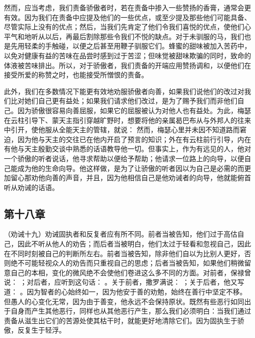 然而，应当考虑，我们责备骄傲者时，若在责备中掺入一些赞扬的香膏，通常会更有效。因为我们在责备中应提及他们的一些优点，或至少提及那些他们可能具备、尽管实际上没有的优点；然后，当我们先肯定了他们令我们喜悦的优点，使他们心平气和地听从以后，再最后割除那些令我们不悦的缺点。对于未驯服的马，我们也是先用轻柔的手触碰，以便之后甚至用鞭子驯服它们。蜂蜜的甜味被加入苦药中，以免对健康有益的苦味在品尝时感到过于苦涩；但味觉被甜味欺骗的同时，致命的体液被苦味排出。所以，对于骄傲者，我们责备的开端应用赞扬调和，以便他们在接受所爱的称赞之时，也能接受所憎恨的责备。\par

此外，我们在多数情况下能更有效地劝服骄傲者向善，如果我们说他们的改过对我们比对她们自己更有益处；如果我们请求他们改过，是为了赐予我们而非他们自己。因为骄傲很容易向善屈服，如果它的屈服被认为对他人也有益处。为此，梅瑟在云柱引导下、蒙天主指引穿越旷野时，想要将他的亲属曷巴布从与外邦人的往来中引开，使他服从全能天主的管辖，就说：  然而，梅瑟心里并未因不知道路而窘迫，因为他与天主的交往已在他内开启了预言的知识；外在有云柱前行引导，内在有他与天主殷勤交谈中熟悉的话语教导他一切。但事实上，作为有远见的人，他对一个骄傲的听者说话，他寻求帮助以便给予帮助；他请求一位路上的向导，以便自己能成为他的生命向导。他这样做，是为了让骄傲的听者因以为自己是必需的而更加留心那劝他向善的声音，并且，因为他相信自己是他劝诫者的向导，他就能俯首听从劝诫的话语。\par


\subsection{第十八章}

\par

（劝诫十九）劝诫固执者和反复者应有所不同。前者当被告知，他们过于高估自己，因此不听从他人的劝告；而后者当被明白，他们太过于轻看和忽视自己，因此在不同时刻被自己的判断所左右。前者当被告知，除非他们自以为比别人更好，否则绝不可能轻视众人的劝告而只重视自己的思虑；后者当被告知，如果他们稍微留意自己的本相，变化的微风绝不会使他们卷进这么多不同的方面。对前者，保禄曾说： ；对后者，应听到这句话： 。关于前者，撒罗满说： ；关于后者，他又写道： 。因为智者的心始终如一，因为他安于善的劝勉，始终在善行中坚定不移。但愚人的心变化无常，因为由于善变，他永远不会保持原状。既然有些恶行如同出于自身而产生其他恶行，同样也从其他恶行产生，那么我们必须明白：当我们通过责备从滋生出它们的苦源处使其枯干时，就能更好地清除它们。因为固执生于骄傲，反复生于轻浮。\par

